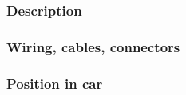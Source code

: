 \subsubsection{Description}

\subsubsection{Wiring, cables, connectors}

\subsubsection{Position in car}